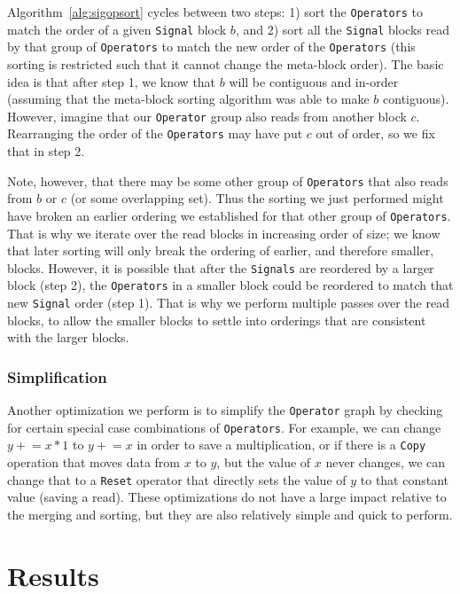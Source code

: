 \documentclass{article}
\begin{document}
Algorithm~\ref{alg:sigopsort} cycles between two steps: 1) sort the \texttt{Operators} to match the order of a given \texttt{Signal} block $b$, and 2) sort all the \texttt{Signal} blocks read by that group of \texttt{Operators} to match the new order of the \texttt{Operators} (this sorting is restricted such that it cannot change the meta-block order).  The basic idea is that after step 1, we know that $b$ will be contiguous and in-order (assuming that the meta-block sorting algorithm was able to make $b$ contiguous).  However, imagine that our \texttt{Operator} group also reads from another block $c$.  Rearranging the order of the \texttt{Operators} may have put $c$ out of order, so we fix that in step 2.  

Note, however, that there may be some other group of \texttt{Operators} that also reads from $b$ or $c$ (or some overlapping set).  Thus the sorting we just performed might have broken an earlier ordering we established for that other group of \texttt{Operators}.  That is why we iterate over the read blocks in increasing order of size; we know that later sorting will only break the ordering of earlier, and therefore smaller, blocks.  However, it is possible that after the \texttt{Signals} are reordered by a larger block (step 2), the \texttt{Operators} in a smaller block could be reordered to match that new \texttt{Signal} order (step 1).  That is why we perform multiple passes over the read blocks, to allow the smaller blocks to settle into orderings that are consistent with the larger blocks.

\subsubsection{Simplification}

Another optimization we perform is to simplify the \texttt{Operator} graph by checking for certain special case combinations of \texttt{Operators}.  For example, we can change $y\mathrel{+}=x*1$ to $y\mathrel{+}=x$ in order to save a multiplication, or if there is a \texttt{Copy} operation that moves data from $x$ to $y$, but the value of $x$ never changes, we can change that to a \texttt{Reset} operator that directly sets the value of $y$ to that constant value (saving a read).  These optimizations do not have a large impact relative to the merging and sorting, but they are also relatively simple and quick to perform.

\section{Results}
\label{sec:results}
\end{document}
